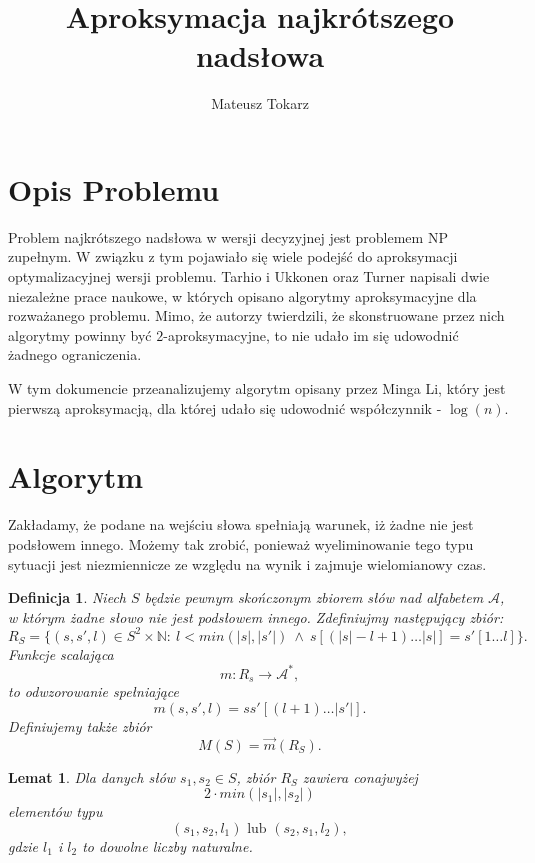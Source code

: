 \documentclass[12pt]{article}
\theoremstyle{plain}
\newtheorem*{df}{Definicja}
\newtheorem*{lemat}{Lemat}
\begin{document}
\title{Aproksymacja najkrótszego nadsłowa}
\author{Mateusz Tokarz}
\maketitle

\section*{Opis Problemu}
Problem najkrótszego nadsłowa w wersji decyzyjnej jest problemem NP zupełnym. W związku z tym pojawiało się wiele podejść do aproksymacji optymalizacyjnej wersji problemu. Tarhio i Ukkonen \cite{TahiroUkonen} oraz Turner \cite{Turner} napisali dwie niezależne prace naukowe, w których opisano algorytmy aproksymacyjne dla rozważanego problemu. Mimo, że autorzy twierdzili, że skonstruowane przez nich algorytmy powinny być $2$-aproksymacyjne, to nie udało im się udowodnić żadnego ograniczenia. 


W tym dokumencie przeanalizujemy algorytm opisany przez Minga Li, który jest pierwszą aproksymacją, dla której udało się udowodnić współczynnik - $\log(n)$. 

\section*{Algorytm}
Zakładamy, że podane na wejściu słowa spełniają warunek, iż żadne nie jest podsłowem innego. Możemy tak zrobić, ponieważ wyeliminowanie tego typu sytuacji jest niezmiennicze ze względu na wynik i zajmuje wielomianowy czas.
\newline 

\begin{df}
Niech $S$ będzie pewnym skończonym zbiorem słów nad alfabetem $\mathcal{A}$, w którym żadne słowo nie jest podsłowem innego. Zdefiniujmy następujący zbiór:
$$R_S = \{(s, s', l) \in S^2 \times \mathbb{N}:\ l < min(|s|, |s'|)\ \land\ s[(|s|-l+1)\dots|s|] = s'[1\dots l] \}.$$
Funkcje scalająca 
$$m: R_s \rightarrow \mathcal{A}^*,$$
to odwzorowanie spełniające 
$$m(s, s', l) = s s'[(l+1)\dots |s'|].$$
Definiujemy także zbiór
$$M(S) = \overrightarrow{m}(R_S).$$
\end{df}

\bigskip

\begin{lemat}
Dla danych słów $s_1, s_2 \in S$, zbiór $R_S$ zawiera conajwyżej 
$$2\cdot min(|s_1|, |s_2|)$$ 
elementów typu 
$$(s_1, s_2, l_1) \text{ lub } (s_2, s_1, l_2),$$
gdzie $l_1$ i $l_2$ to dowolne liczby naturalne.
\end{lemat}
\end{document}
